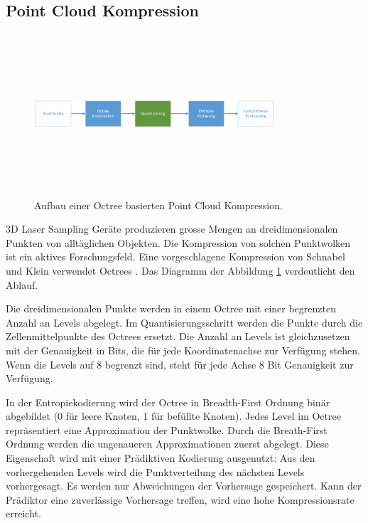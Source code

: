 \subsection{Point Cloud Kompression} \label{state:pointcloud}
\begin{figure}[!htbp]
	\center
	\includegraphics[width=0.8\textwidth,height=6cm,keepaspectratio]{./pictures/state/pointcloud.png}
	\caption{Aufbau einer Octree basierten Point Cloud Kompression.}
	\label{state:pointcloud:abb}
\end{figure}
3D Laser Sampling Geräte produzieren grosse Mengen an dreidimensionalen Punkten von alltäglichen Objekten. Die Kompression von solchen Punktwolken ist ein aktives Forschungsfeld. Eine vorgeschlagene Kompression  von Schnabel und Klein \cite{schnabel2006octree} verwendet Octrees \cite{wiki:octree}. Das Diagramm der Abbildung \ref{state:pointcloud:abb} verdeutlicht den Ablauf.

Die dreidimensionalen Punkte werden in einem Octree mit einer begrenzten Anzahl an Levels abgelegt. Im Quantisierungsschritt werden die Punkte durch die Zellenmittelpunkte des Octrees ersetzt. Die Anzahl an Levels ist gleichzusetzen mit der Genauigkeit in Bits, die für jede Koordinatenachse zur Verfügung stehen. Wenn die Levels auf 8 begrenzt sind, steht für jede Achse 8 Bit Genauigkeit zur Verfügung.

In der Entropiekodierung wird der Octree in Breadth-First Ordnung binär abgebildet (0 für leere Knoten, 1 für befüllte Knoten). Jedes Level im Octree repräsentiert eine Approximation der Punktwolke. Durch  die Breath-First Ordnung werden die ungenaueren Approximationen zuerst abgelegt. Diese Eigenschaft wird mit einer Prädiktiven Kodierung ausgenutzt: Aus den vorhergehenden Levels wird die Punktverteilung des nächsten Levels vorhergesagt. Es werden nur Abweichungen der Vorhersage gespeichert. Kann der Prädiktor eine zuverlässige Vorhersage treffen, wird eine hohe Kompressionsrate erreicht.

